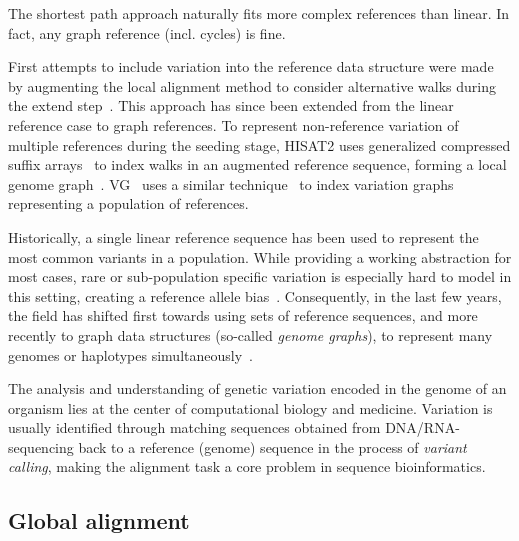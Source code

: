 The shortest path approach naturally fits more complex references than linear.
In fact, any graph reference (incl. cycles) is fine.

First attempts to include variation into the reference data structure were made
by augmenting the local alignment method to consider alternative walks during the
extend step~\cite{schneeberger_simultaneous_2009,palmapper}. This approach has
since been extended from the linear reference case to graph references. To
represent non-reference variation of multiple references during the seeding
stage, HISAT2 uses generalized compressed suffix
arrays~\cite{siren_indexing_2014} to index walks in an augmented reference
sequence, forming a local genome graph~\cite{kim_graphbased_2019}.
VG~\cite{garrison_variation_2018} uses a similar
technique~\cite{siren_indexing_2017} to index variation graphs representing a
population of references.

Historically, a single linear reference sequence has been used to represent the
most common variants in a population. While providing a working abstraction for
most cases, rare or sub-population specific variation is especially hard to
model in this setting, creating a reference allele
bias~\cite{stevenson_sources_2013,brandt_mapping_2015}. Consequently, in the
last few years, the field has shifted first towards using sets of reference
sequences, and more recently to graph data structures (so-called {\em genome
graphs}), to represent many genomes or haplotypes
simultaneously~\cite{dilthey_improved_2015,paten_genome_2017,garrison_variation_2018}.

The analysis and understanding of genetic variation encoded in the genome of an
organism lies at the center of computational biology and medicine. Variation is
usually identified through matching sequences obtained from DNA/RNA-sequencing
back to a reference (genome) sequence in the process of \emph{variant calling},
making the alignment task a core problem in sequence bioinformatics.

\subsection*{Global alignment}
%

